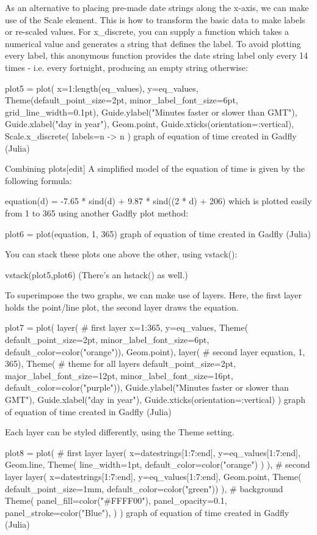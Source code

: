 As an alternative to placing pre-made date strings along the x-axis, we can make use of the Scale element. This is how to transform the basic data to make labels or re-scaled values. For x_discrete, you can supply a function which takes a numerical value and generates a string that defines the label. To avoid plotting every label, this anonymous function provides the date string label only every 14 times - i.e. every fortnight, producing an empty string otherwise:

plot5 = plot(
   x=1:length(eq_values),    
   y=eq_values, 
   Theme(default_point_size=2pt, 
         minor_label_font_size=6pt,
         grid_line_width=0.1pt),
   Guide.ylabel("Minutes faster or slower than GMT"),
   Guide.xlabel("day in year"),
   Geom.point,
   Guide.xticks(orientation=:vertical),
   Scale.x_discrete(
         labels=n -> n%
)
graph of equation of time created in Gadfly (Julia)

Combining plots[edit]
A simplified model of the equation of time is given by the following formula:

equation(d) = -7.65 * sind(d) + 9.87 * sind((2 * d) + 206)
which is plotted easily from 1 to 365 using another Gadfly plot method:

plot6 = plot(equation, 1, 365)
graph of equation of time created in Gadfly (Julia)

You can stack these plots one above the other, using vstack():

vstack(plot5,plot6)
(There's an hstack() as well.)

To superimpose the two graphs, we can make use of layers. Here, the first layer holds the point/line plot, the second layer draws the equation.

plot7 = plot(
 layer(
   # first layer
   x=1:365,
   y=eq_values,
   Theme(
     default_point_size=2pt, 
     minor_label_font_size=6pt,
     default_color=color("orange")),
   Geom.point), 
 layer(        
  # second layer
   equation, 1, 365),
 Theme(    
 # theme for all layers
   default_point_size=2pt,
   major_label_font_size=12pt,
   minor_label_font_size=16pt, 
   default_color=color("purple")),
 Guide.ylabel("Minutes faster or slower than GMT"),
 Guide.xlabel("day in year"),
 Guide.xticks(orientation=:vertical)
)
graph of equation of time created in Gadfly (Julia)

Each layer can be styled differently, using the Theme setting.

plot8 = plot(
 # first layer
 layer(
   x=datestrings[1:7:end],
   y=eq_values[1:7:end],  
   Geom.line,
   Theme(
      line_width=1pt,
      default_color=color("orange")
   )
 ),
 # second layer
 layer(
   x=datestrings[1:7:end],
   y=eq_values[1:7:end],
   Geom.point,
   Theme(
      default_point_size=1mm,
      default_color=color("green"))
 ),
  # background 
  Theme(
     panel_fill=color("#FFFF00"),
     panel_opacity=0.1,
     panel_stroke=color("Blue"),
   )
)
graph of equation of time created in Gadfly (Julia)

